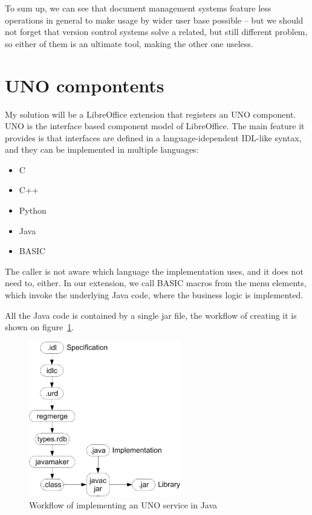To sum up, we can see that document management systems feature less operations
in general to make usage by wider user base possible -- but we should not
forget that version control systems solve a related, but still different
problem, so either of them is an ultimate tool, making the other one useless.

\section{UNO compontents}

My solution will be a LibreOffice extension that registers an UNO\cite{uno}
component. UNO is the interface based component model of LibreOffice. The main
feature it provides is that interfaces are defined in a language-idependent
IDL-like syntax, and they can be implemented in multiple languages:

\begin{itemize}
\item C
\item C++
\item Python
\item Java
\item BASIC
\end{itemize}

The caller is not aware which language the implementation uses, and it does not
need to, either. In our extension, we call BASIC macros from the menu elements,
which invoke the underlying Java code, where the business logic is implemented.

All the Java code is contained by a single jar file, the workflow of creating
it is shown on figure~\ref{fig:uno-java}.

\begin{figure}[H]
\centering
\includegraphics[width=250px,keepaspectratio]{uno-java.pdf}
\caption{Workflow of implementing an UNO service in Java}
\label{fig:uno-java}
\end{figure}

